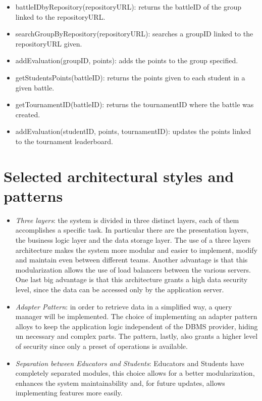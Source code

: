 \documentclass[12pt, a4paper]{report}
\begin{document}
\begin{itemize}
        \item battleIDbyRepository(repositoryURL): returns the battleID of the group linked to the repositoryURL. 
        \item searchGroupByRepository(repositoryURL): searches a groupID linked to the repositoryURL given. 
        \item addEvaluation(groupID, points): adds the points to the group specified. 
        \item getStudentsPoints(battleID): returns the points given to each student in a given battle. 
        \item getTournamentID(battleID): returns the tournamentID where the battle was created. 
        \item addEvaluation(studentID, points, tournamentID): updates the points linked to the tournament leaderboard. 
    \end{itemize}

    \section{Selected architectural styles and patterns}
    \begin{itemize}
        \item \textit{Three layers}: the system is divided in three distinct layers, each of them accomplishes a specific task.
            In particular there are the presentation layers, the business logic layer and the data storage layer.
            The use of a three layers architecture makes the system more modular and easier to implement, modify and maintain even between different teams.
            Another advantage is that this modularization allows the use of load balancers between the various servers.
            One last big advantage is that this architecture grants a high data security level, since the data can be accessed only by the application server.
        \item \textit{Adapter Pattern}: in order to retrieve data in a simplified way, a query manager will be implemented.
            The choice of implementing an adapter pattern alloys to keep the application logic independent of the DBMS provider, hiding un necessary and complex parts. 
            The pattern, lastly, also grants a higher level of security since only a preset of operations is available. 
        \item \textit{Separation between Educators and Students}: Educators and Students have completely separated modules, this choice allows for a better modularization,
            enhances the system maintainability and, for future updates, allows implementing features more easily. 
    \end{itemize}
\end{document}
